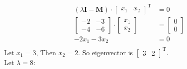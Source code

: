 \documentclass{article}
\begin{document}
\begin{itemize}
\begin{align*}
(\lambda \bm{I} - \bm{M}) \cdot \begin{bmatrix}
			x_{1} & x_{2}
		\end{bmatrix}^\mathrm{T} &= 0\\
		\begin{bmatrix}
			-2 & -3 \\
			-4 & -6
		\end{bmatrix} \cdot 
		\begin{bmatrix}
			x_{1} \\
			x_{2}
		\end{bmatrix}&= 
			\begin{bmatrix}
				0 \\ 0
			\end{bmatrix}\\
			-2x_{1} - 3x_{2} &= 0\\
\end{align*}
Let $x_{1} = 3$, Then $x_{2} = 2$. So eigenvector is $\begin{bmatrix}
	3 & 2
\end{bmatrix}^{\mathrm{T}}.$\\
Let $\lambda = 8$:\\


\end{itemize}
\end{document}
